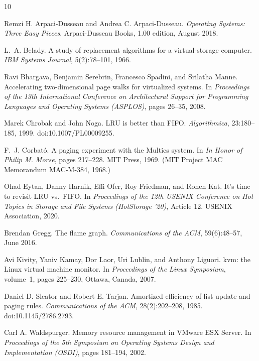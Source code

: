 \documentclass[letterpaper,twocolumn,10pt]{article}
\begin{document}
\balance
\begin{thebibliography}{10}

Remzi H. Arpaci-Dusseau and Andrea C. Arpaci-Dusseau. \textit{Operating Systems:
Three Easy Pieces}. Arpaci-Dusseau Books, 1.00 edition, August 2018.

L.~A. Belady. A study of replacement algorithms for a virtual-storage computer.
\textit{IBM Systems Journal}, 5(2):78--101, 1966.

Ravi Bhargava, Benjamin Serebrin, Francesco Spadini, and Srilatha Manne.
Accelerating two-dimensional page walks for virtualized systems. In
\textit{Proceedings of the 13th International Conference on Architectural Support
for Programming Languages and Operating Systems (ASPLOS)}, pages 26--35, 2008.

Marek Chrobak and John Noga. LRU is better than FIFO. \textit{Algorithmica},
23:180--185, 1999. doi:10.1007/PL00009255.

F.~J. Corbató. A paging experiment with the Multics system. In \textit{In Honor of
Philip M. Morse}, pages 217--228. MIT Press, 1969. (MIT Project MAC Memorandum
MAC-M-384, 1968.)

Ohad Eytan, Danny Harnik, Effi Ofer, Roy Friedman, and Ronen Kat. It's time to
revisit LRU vs.\ FIFO. In \textit{Proceedings of the 12th USENIX Conference on Hot
Topics in Storage and File Systems (HotStorage '20)}, Article 12. USENIX
Association, 2020.

Brendan Gregg. The flame graph. \textit{Communications of the ACM},
59(6):48--57, June 2016.

Avi Kivity, Yaniv Kamay, Dor Laor, Uri Lublin, and Anthony Liguori. kvm: the Linux
virtual machine monitor. In \textit{Proceedings of the Linux Symposium}, volume~1,
pages 225--230, Ottawa, Canada, 2007.

Daniel D. Sleator and Robert E. Tarjan. Amortized efficiency of list update and
paging rules. \textit{Communications of the ACM}, 28(2):202--208, 1985.
doi:10.1145/2786.2793.

Carl A. Waldspurger. Memory resource management in VMware ESX Server. In
\textit{Proceedings of the 5th Symposium on Operating Systems Design and
Implementation (OSDI)}, pages 181--194, 2002.

\end{thebibliography}
\end{document}
